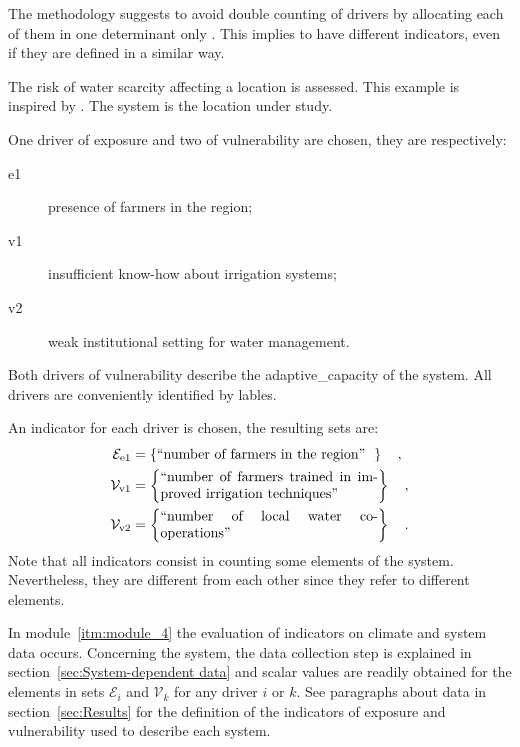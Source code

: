 The methodology suggests to avoid double counting of \glspl{driver} by allocating each of them in one \gls{determinant} only \cite[29]{2017GIZRiskSupplement}. This implies to have different \glspl{indicator}, even if they are defined in a similar way.
\begin{example}
  The risk of water scarcity affecting a location is assessed. This example is inspired by \cite[46]{2017GIZRiskSupplement}. The system is the location under study.
  
  One \gls{driver} of \gls{exposure} and two of \gls{vulnerability} are chosen, they are respectively:
  \begin{description}
    \item[e1] presence of farmers in the region;
    \item[v1] insufficient know-how about irrigation systems;
    \item[v2] weak institutional setting for water management.
  \end{description}
  Both \glspl{driver} of \gls{vulnerability} describe the \gls{adaptive_capacity} of the system. All \glspl{driver} are conveniently identified by lables.
  
  An \gls{indicator} for each \gls{driver} is chosen, the resulting sets are:
  \begin{align*}
    \mathcal{E}_\text{e1} & = \left\{ \parbox{0.45\linewidth}{``number of farmers in the region''} \right\}
    \quad , \\
    \mathcal{V}_\text{v1} & = \left\{ \parbox{0.45\linewidth}{``number of farmers trained in improved irrigation techniques''} \right\}
    \quad , \\
    \mathcal{V}_\text{v2} & = \left\{ \parbox{0.45\linewidth}{``number of local water co-operations''} \right\}
    \quad .
  \end{align*}
  Note that all \glspl{indicator} consist in counting some elements of the system. Nevertheless, they are different from each other since they refer to different elements.
\end{example}

In module~\ref{itm:module_4} the evaluation of \glspl{indicator} on climate and system data occurs. Concerning the system, the data collection step is explained in section~\ref{sec:System-dependent data} and scalar values are readily obtained for the elements in sets $\mathcal{E}_i$ and $\mathcal{V}_k$ for any \gls{driver} $i$ or $k$. See paragraphs about data in section~\ref{sec:Results} for the definition of the \glspl{indicator} of \gls{exposure} and \gls{vulnerability} used to describe each system.


